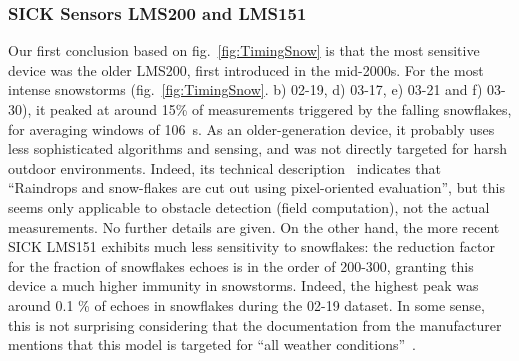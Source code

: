 \subsubsection{SICK Sensors LMS200 and LMS151}
Our first conclusion based on fig.~\ref{fig:TimingSnow} is that the most sensitive device was the older LMS200, first introduced in the mid-2000s. For the most intense snowstorms (fig.~\ref{fig:TimingSnow}. b) 02-19, d) 03-17, e) 03-21 and f) 03-30), it peaked at around 15\% of measurements triggered by the falling snowflakes, for averaging windows of \SI{106}{\second}. As an older-generation device, it probably uses less sophisticated algorithms and sensing, and was not directly targeted for harsh outdoor environments. Indeed, its technical description~\cite{LMS200Manual} indicates that ``Raindrops and snow-flakes are cut out using pixel-oriented evaluation'', but this seems only applicable to obstacle detection (field computation), not the actual measurements. No further details are given. On the other hand, the more recent SICK LMS151 exhibits much less sensitivity to snowflakes: the reduction factor for the fraction of snowflakes echoes is in the order of 200-300, granting this device a much higher immunity in snowstorms. Indeed, the highest peak was around 0.1 \% of echoes in snowflakes during the 02-19 dataset. In some sense, this is not surprising considering that the documentation from the manufacturer mentions that this model is targeted for ``all weather conditions''~\cite{LMS151Manual}.


